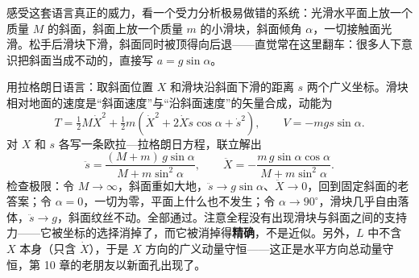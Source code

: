 \begin{challenge}
感受这套语言真正的威力，看一个受力分析极易做错的系统：光滑水平面上放一个质量 \(M\) 的斜面，斜面上放一个质量 \(m\) 的小滑块，斜面倾角 \(\alpha\)，一切接触面光滑。松手后滑块下滑，斜面同时被顶得向后退——直觉常在这里翻车：很多人下意识把斜面当成不动的，直接写 \(a=g\sin\alpha\)。

用拉格朗日语言：取斜面位置 \(X\) 和滑块沿斜面下滑的距离 \(s\) 两个广义坐标。滑块相对地面的速度是“斜面速度”与“沿斜面速度”的矢量合成，动能为
\[
T=\tfrac12 M\dot X^2+\tfrac12 m\left(\dot X^2+2\dot X\dot s\cos\alpha+\dot s^2\right),
\qquad
V=-mgs\sin\alpha .
\]
对 \(X\) 和 \(s\) 各写一条欧拉—拉格朗日方程，联立解出
\[
\ddot s=\frac{(M+m)\,g\sin\alpha}{M+m\sin^2\alpha},
\qquad
\ddot X=-\frac{m\,g\sin\alpha\cos\alpha}{M+m\sin^2\alpha}.
\]
检查极限：令 \(M\to\infty\)，斜面重如大地，\(\ddot s\to g\sin\alpha\)、\(\ddot X\to 0\)，回到固定斜面的老答案；令 \(\alpha=0\)，一切为零，平面上什么也不发生；令 \(\alpha\to 90^\circ\)，滑块几乎自由落体，\(\ddot s\to g\)，斜面纹丝不动。全部通过。注意全程没有出现滑块与斜面之间的支持力——它被坐标的选择消掉了，而它被消掉得\textbf{精确}，不是近似。另外，\(L\) 中不含 \(X\) 本身（只含 \(\dot X\)），于是 \(X\) 方向的广义动量守恒——这正是水平方向总动量守恒，第 10 章的老朋友以新面孔出现了。
\end{challenge}


